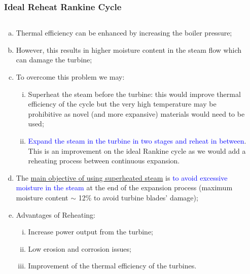 \documentclass[10pt,compress,handout,ignorenonframetext]{beamer}
\newcommand{\blue}{\textcolor{blue}}
\begin{document}
\begin{frame}
 \frametitle{Ideal Reheat Rankine Cycle}
  \begin{columns}
     \begin{column}[c]{0.5\linewidth}
        \begin{enumerate}[(a)] \scriptsize
           \item<1-> Thermal efficiency can be enhanced by increasing the boiler pressure;
           \item<1-> However, this results in higher moisture content in the steam flow which can damage the turbine;
           \item<2-> To overcome this problem we may:
           \begin{enumerate}[(i)] \scriptsize
             \item<2-> Superheat the steam before the turbine: this would improve thermal efficiency of the cycle but the very high temperature may be prohibitive as novel (and more expansive) materials would need to be used;
             \item<2-> \blue{Expand the steam in the turbine in two stages and reheat in between}. This is an improvement on the ideal Rankine cycle as we would add a reheating process between continuous expansion.
           \end{enumerate}
           \item<3-> The \underline{main objective of using superheated steam} is \blue{to avoid excessive moisture in the steam} at the end of the expansion process (maximum moisture content $\sim$ 12$\%$ to avoid turbine blades' damage);
           \item<4-> Advantages of Reheating:
              \begin{enumerate}[(i)]\scriptsize
                 \item<4-> Increase power output from the turbine;
                 \item<4-> Low erosion and corrosion issues;
                 \item<4-> Improvement of the thermal efficiency of the turbines.
              \end{enumerate}
        \end{enumerate}
     \end{column}
     \begin{column}[c]{0.5\linewidth} 
\end{column}
\end{columns}
\end{frame}
\end{document}
